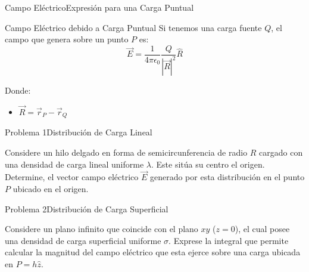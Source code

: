 \documentclass[aspectratio=169]{beamer}
\begin{document}
\primeraDiapo

\begin{frame}{Campo Eléctrico}{Expresión para una Carga Puntual}
    \begin{boxTeoria}{Campo Eléctrico debido a Carga Puntual}
        Si tenemos una carga fuente $Q$, el campo que genera sobre un punto
        $P$ es:
        \begin{equation*}
            \vec{E} = \frac{1}{4\pi\epsilon_0} \frac{Q}{|\vec{R}|^2} \hat{R}
        \end{equation*}

        Donde:
        \begin{itemize}
            \item $\vec{R} = \vec{r}_P - \vec{r}_Q$
        \end{itemize}
    \end{boxTeoria}
\end{frame}

\begin{frame}{Problema 1}{Distribución de Carga Lineal}

    Considere un hilo delgado en forma de semicircunferencia de radio $R$ cargado con una densidad de carga lineal uniforme $\lambda$. Este sitúa su centro el origen. Determine, el vector campo eléctrico $\vec{E}$ generado por esta distribución en el punto $P$ ubicado en el origen.

    \begin{center}
    \end{center}

\end{frame}

\begin{frame}{Problema 2}{Distribución de Carga Superficial}

    Considere un plano infinito que coincide con el plano $xy$ ($z = 0$), el cual posee una densidad de carga superficial uniforme $\sigma$. Exprese la integral que permite calcular la magnitud del campo eléctrico que esta ejerce sobre una carga ubicada en $P=h\hat{z}$.


\end{frame}
\end{document}

